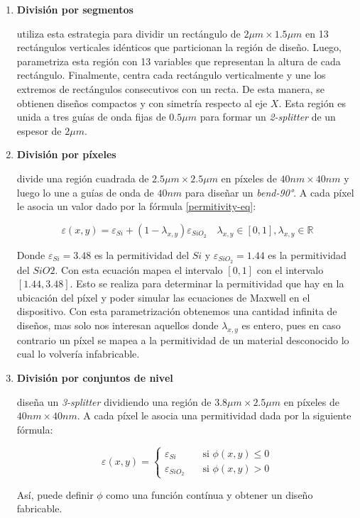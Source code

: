 \begin{enumerate}

  \item \textbf{División por segmentos}

  \cite{Prosopio-Galarza2019} utiliza esta estrategia para dividir un rectángulo de $2\mu m \times 1.5 \mu m$ en 13 rectángulos verticales idénticos que particionan la región de diseño.
    Luego, parametriza esta región con 13 variables que representan la altura de cada rectángulo. 
    Finalmente, centra cada rectángulo verticalmente y une los extremos de rectángulos consecutivos con un recta. 
    De esta manera, se obtienen diseños compactos y con simetría respecto al eje $X$.
    Esta región es unida a tres guías de onda fijas de $0.5 \mu m$ para formar un \emph{2-splitter} de un espesor de $2 \mu m$.

  \item \textbf{División por píxeles}

    \cite{Su2020} divide una región cuadrada de $2.5 \mu m \times 2.5 \mu m$ en píxeles de $40 nm \times 40 nm$ y luego lo une a guías de onda de $40 nm$ para diseñar un \emph{bend-90°}. 
    A cada píxel le asocia un valor dado por la fórmula \ref{permitivity-eq}:

  \begin{equation}
    \varepsilon(x, y) = \varepsilon_{Si} + (1 - \lambda_{x,y}) \varepsilon_{SiO_2} \quad \lambda_{x, y} \in [0, 1], \lambda_{x, y} \in \mathbb{R} 
  \label{permitivity-eq}
  \end{equation}

  Donde $\varepsilon_{Si} = 3.48$ es la permitividad del $Si$ y $\varepsilon_{SiO_2} = 1.44$ es la permitividad del $SiO2$.
  Con esta ecuación \citet{Su2020} mapea el intervalo $[0, 1]$ con el intervalo $[1.44, 3.48]$. 
  Esto se realiza para determinar la permitividad que hay en la ubicación del píxel y poder simular las ecuaciones de Maxwell en el dispositivo.
  Con esta parametrización obtenemos una cantidad infinita de diseños, mas solo nos interesan aquellos donde $\lambda_{x,y}$ es entero, pues en caso contrario un píxel se mapea a la permitividad de un material desconocido lo cual lo volvería infabricable.
  

  \item \textbf{División por conjuntos de nivel}

    \cite{Piggott2017} diseña un \emph{3-splitter} dividiendo una región de $3.8 \mu m \times 2.5 \mu m$ en píxeles de $40 nm \times 40 nm$. A cada píxel le asocia una permitividad dada por la siguiente fórmula:

  \[ \varepsilon(x, y) =
    \begin{cases}
      \varepsilon_{Si}       & \quad \text{si } \phi(x, y) \leq 0\\
      \varepsilon_{SiO_2}    & \quad \text{si } \phi(x, y) > 0
    \end{cases}
  \]

  Así, \cite{Piggott2017} puede definir $\phi$ como una función contínua y obtener un diseño fabricable.



\end{enumerate}

